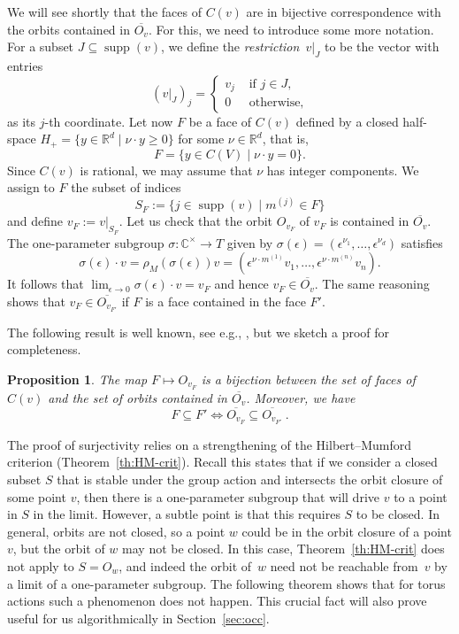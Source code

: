 \documentclass[10pt,a4paper]{article}
\DeclareMathOperator{\supp}{supp}
\newtheorem{proposition}[theorem]{Proposition}
\theoremstyle{definition}
\numberwithin{equation}{section}
\newcommand{\CC}{\mathbb{C}}
\newcommand{\RR}{\mathbb{R}}
\begin{document}
We will see shortly that the faces of $C(v)$ are in bijective correspondence with the orbits contained in $\overline{O_v}$.
For this, we need to introduce some more notation.
For a subset $J \subseteq \supp(v)$, we define the \emph{restriction}~$v|_{J}$ to be the vector with entries
\[
(v|_{J})_j = \begin{cases}
 v_j & \mbox{ if } j \in J,\\
 0 & \mbox{ otherwise,}
 \end{cases}
\] as its $j$-th coordinate.
Let now $F$ be a face of $C(v)$ defined by a closed half-space $H_+ = \{ y \in \RR^d \;|\; \nu \cdot y \geq 0 \}$ for some $\nu\in\RR^d$, that is,
\[
 F= \{ y\in C(V) \mid \nu \cdot y = 0 \}.
\]
Since $C(v)$ is rational, we may assume that $\nu$ has integer components.
We assign to $F$ the subset of indices
\[
 S_F := \{ j \in \supp(v) \mid m^{(j)} \in F \}
\]
and define $v_F := v|_{S_F}$.
Let us check that the orbit $O_{v_F}$ of $v_F$ is contained in $\overline{O_v}$.
The one-parameter subgroup $\sigma\colon \CC^\times \to T$ given by $\sigma(\epsilon) = (\epsilon^{\nu_1},\ldots,\epsilon^{\nu_d})$ satisfies
\begin{equation}\label{eq:SEV}
 \sigma(\epsilon) \cdot v = \rho_M(\sigma(\epsilon)) v = (\epsilon^{\nu \cdot m^{(1)}} v_1,\ldots,\epsilon^{\nu \cdot m^{(n)}} v_n) .
\end{equation}
It follows that $\lim_{\epsilon\to 0} \sigma(\epsilon) \cdot v = v_F$ and hence $v_F \in \overline{O_v}$.
The same reasoning shows that $v_{F} \in \overline{O_{v_{F'}}}$ if $F$ is a face contained in the face $F'$.


The following result is well known, see e.g., \cite[Example~1.3]{Popov-occ}, but we sketch a proof for completeness.

\begin{proposition} \label{prop:orbit-structure}
The map $F\mapsto O_{v_F}$ is a bijection between the set of faces of $C(v)$ and
the set of orbits contained in $\overline{O_v}$. Moreover, we have
$$
  F\subseteq F' \Longleftrightarrow \overline{O_{v_F}}\subseteq\overline{O_{v_{F'}}}\ .
$$
\end{proposition}

The proof of surjectivity relies on a strengthening of the Hilbert--Mumford criterion (Theorem~\ref{th:HM-crit}).
Recall this states that if we consider a closed subset $S$ that is stable under the group action and intersects the orbit closure of some point $v$,
then there is a one-parameter subgroup that will drive $v$ to a point in $S$ in the limit.
However, a subtle point is that this requires $S$ to be closed. In general, orbits are not closed, so a point $w$ could be in the orbit closure of a point $v$, but the orbit of $w$ may not be closed.
In this case, Theorem~\ref{th:HM-crit} does not apply to $S=O_w$, and indeed the orbit of~$w$ need not be reachable from~$v$ by a limit of a one-parameter subgroup.
The following theorem shows that for torus actions such a phenomenon does not happen.
This crucial fact will also prove useful for us algorithmically in Section~\ref{sec:occ}.
\end{document}
